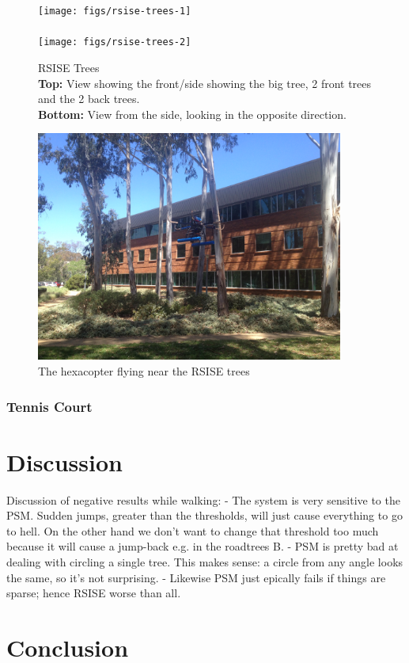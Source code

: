 \documentclass[12pt,oneside,a4paper]{book}
\begin{document}
\begin{figure}
  \centering
  \texttt{[image: figs/rsise-trees-1]}\\
  ~\\
  \texttt{[image: figs/rsise-trees-2]}
  \caption{RSISE Trees\\\textbf{Top:} View showing the front/side
    showing the big tree, 2 front trees
    and the 2 back trees.\\\textbf{Bottom:} View from the side, looking
  in the opposite direction.}
  \label{fig:rsise-trees}
\end{figure}

\begin{figure}
  \centering
  \includegraphics[width=0.9\textwidth]{figs/rsise-flying}
  \caption{The hexacopter flying near the RSISE trees}
  \label{fig:rsise-flying}
\end{figure}

\subsection{Tennis Court}
\label{sec:tennis-court-1}



\chapter{Discussion}
\label{cha:discussion}

Discussion of negative results while walking:
 - The system is very sensitive to the PSM. Sudden jumps, greater than
 the thresholds, will just cause everything to go to hell. On the
 other hand we don't want to change that threshold too much because it
 will cause a jump-back e.g. in the roadtrees B.
 - PSM is pretty bad at dealing with circling a single tree. This
 makes sense: a circle from any angle looks the same, so it's not
 surprising.
 - Likewise PSM just epically fails if things are sparse; hence RSISE
 worse than all.

\chapter{Conclusion}
\label{cha:conclusion}



%

\backmatter


\end{document}
